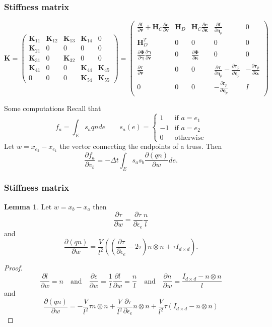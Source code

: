 \documentclass[8pt]{beamer}
\numberwithin{equation}{section}
\theoremstyle{definition}
\newtheorem{lem}[prop]{Lemma}
\newcommand{\dind}[2]{\frac{\partial #1}{\partial #2}}
\begin{document}
\begin{frame}
\frametitle{Stiffness matrix}
\[
\boldsymbol{K}=
\begin{pmatrix}
\boldsymbol{K}_{11} & \boldsymbol{K}_{12} & \boldsymbol{K}_{13} & \boldsymbol{K}_{14} & 0 \\
\boldsymbol{K}_{21} & 0 & 0 & 0 & 0 \\
\boldsymbol{K}_{31} & 0 & \boldsymbol{K}_{32} & 0 & 0 \\
\boldsymbol{K}_{41} & 0 & 0 & \boldsymbol{K}_{44} & \boldsymbol{K}_{45} \\
0 & 0 & 0 & \boldsymbol{K}_{54} & \boldsymbol{K}_{55}
\end{pmatrix}=
\begin{pmatrix}
\dind{\boldsymbol{f}}{\boldsymbol{v}}+\boldsymbol H_C\dind{\boldsymbol{c}}{\boldsymbol{v}} & \boldsymbol{H}_D & \boldsymbol{H}_C\dind{\boldsymbol{c}}{\boldsymbol{\kappa}} & \dind{\boldsymbol{f}}{\boldsymbol{\eta}_p} & 0 \\
\boldsymbol{H}_D^T& 0 & 0 & 0 & 0 \\
\dind{\boldsymbol{\Phi}}{\boldsymbol{\gamma}}\dind{\boldsymbol{\gamma}}{\boldsymbol{v}} & 0 & \dind{\boldsymbol{\Phi}}{\boldsymbol{\kappa}} & 0 & 0 \\
\dind{\boldsymbol\tau}{\boldsymbol{v}} & 0 & 0 & \dind{\boldsymbol\tau}{\boldsymbol{\eta}_p}-\dind{\boldsymbol\tau_p}{\boldsymbol{\eta}_p} & -\dind{\boldsymbol\tau_p}{\dot{\boldsymbol{\alpha}}} \\
0 & 0 & 0 & -\dind{\boldsymbol{r}_p}{\boldsymbol{\eta}_p} & I
\end{pmatrix}
\]
\begin{block}{Some computations}
Recall that
\[
f_a=\int_Es_aqnde\qquad s_a(e)=
\begin{cases}
1 & \text{if $a=e_1$} \\
-1 & \text{if $a=e_2$} \\
0 & \text{otherwise}
\end{cases}
\]
Let $w=x_{e_2}-x_{e_1}$ the vector connecting the endpoints of a truss. Then
\[
\dind{f_a}{v_b}=-\Delta t\int_Es_as_b\dind{(qn)}{w}de.
\]
\end{block}

\end{frame}

\begin{frame}
\frametitle{Stiffness matrix}
\begin{lem}
Let $w=x_b-x_a$ then
\[
\dind{\tau}{w}=\dind{\tau}{\epsilon_e}\frac{n}{l}
\]
and
\[
\dind{(qn)}{w}=\frac{V}{l^2}\left(\left(\dind{\tau}{\epsilon_e}-2\tau\right)n\otimes n+\tau I_{d\times d}\right).
\]
\end{lem}
\begin{proof}
\[
\dind{l}{w}=n\quad\text{and}\quad\dind{\epsilon}{w}=\frac{1}{l}\dind{l}{w}=\frac{n}{l}\quad\text{and}\quad\dind{n}{w}=\frac{I_{d\times d}-n\otimes n}{l}
\]
and
\[
\dind{(qn)}{w}=-\frac{V}{l^2}\tau n\otimes n+\frac{V}{l^2}\dind{\tau}{\epsilon_e}n\otimes n+\frac{V}{l^2}\tau(I_{d\times d}-n\otimes n)
\]
\end{proof}
\end{frame}
\end{document}
